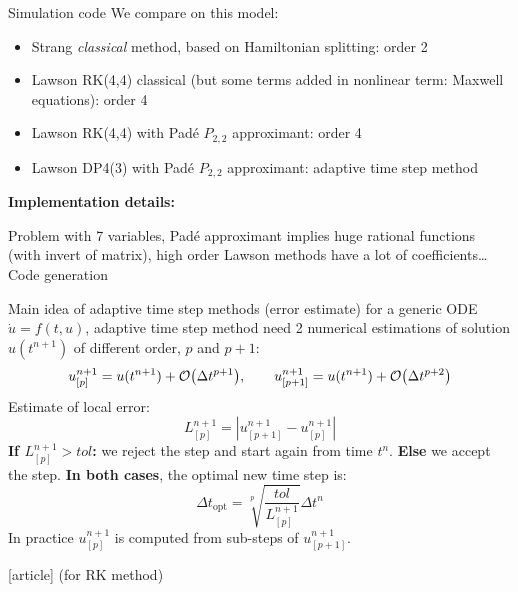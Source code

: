 \documentclass{beamer}
\newcommand{\cmark}{{\color{dgreen}\ding{52}}}
\newcommand{\mbold}[1]{{\textbf{\color{PLB}#1}}}
\newcommand{\customcite}[1]{\cite{#1}}
\begin{document}
\begin{frame}{Simulation code}
  We compare on this model:
  \begin{itemize}
    \item Strang \emph{classical} method, based on Hamiltonian splitting: order 2
    \item Lawson RK(4,4) classical (but some terms added in nonlinear term: Maxwell equations): order 4
    \item Lawson RK(4,4) with Padé $P_{2,2}$ approximant: order 4
    \item Lawson DP4(3) with Padé $P_{2,2}$ approximant: adaptive time step method
  \end{itemize}
  \mbold{Implementation details:}

  Problem with 7 variables, Padé approximant implies huge rational functions (with invert of matrix), high order Lawson methods have a lot of coefficients\dots Code generation \cmark
\end{frame}

\begin{frame}{Main idea of adaptive time step methods (error estimate)}
  for a generic ODE $\dot{u} = f(t,u)$, adaptive time step method need 2 numerical estimations of solution $u(t^{n+1})$ of different order, $p$ and $p+1$:
  $$
    u^{n+1}_{[p]} = u(t^{n+1}) + \order{\Delta t^{p+1}},\qquad u^{n+1}_{[p+1]} = u(t^{n+1}) + \order{\Delta t^{p+2}}
  $$
  Estimate of local error:
  \vspace{-0.5cm}
  $$
    L_{[p]}^{n+1} = \left| u^{n+1}_{[p+1]} - u^{n+1}_{[p]} \right|
  $$
  \mbold{If $L^{n+1}_{[p]}>tol$:} we reject the step and start again from time $t^n$. \mbold{Else} we accept the step. \mbold{In both cases}, the optimal new time step is:
  $$
    \Delta t_\text{opt} = \sqrt[p]{\frac{tol}{L^{n+1}_{[p]}}}\Delta t^n
  $$
  In practice $u^{n+1}_{[p]}$ is computed from sub-steps of $u^{n+1}_{[p+1]}$.

  \begin{thebibliography}{9}
    [article]
     \customcite{Dormand:1978} \textcolor{defaultcolor}{(for RK method)}
  \end{thebibliography}
\end{frame}
\end{document}
